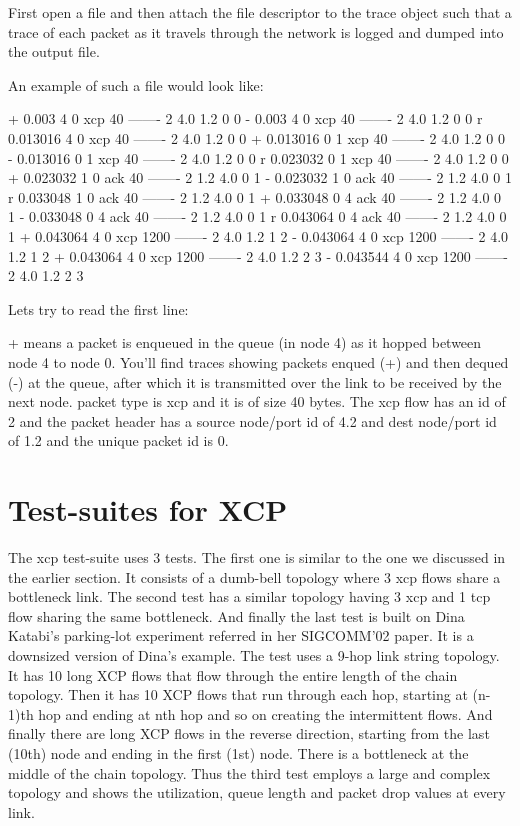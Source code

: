   First open a file and then attach the file descriptor to the \ns{}
  trace object such that a trace of each packet as it travels through
  the network is logged and dumped into the output file.
  
  An example of such a file would look like:
  \begin{program}
    + 0.003 4 0 xcp 40 ------- 2 4.0 1.2 0 0
    - 0.003 4 0 xcp 40 ------- 2 4.0 1.2 0 0
    r 0.013016 4 0 xcp 40 ------- 2 4.0 1.2 0 0
    + 0.013016 0 1 xcp 40 ------- 2 4.0 1.2 0 0
    - 0.013016 0 1 xcp 40 ------- 2 4.0 1.2 0 0
    r 0.023032 0 1 xcp 40 ------- 2 4.0 1.2 0 0
    + 0.023032 1 0 ack 40 ------- 2 1.2 4.0 0 1
    - 0.023032 1 0 ack 40 ------- 2 1.2 4.0 0 1
    r 0.033048 1 0 ack 40 ------- 2 1.2 4.0 0 1
    + 0.033048 0 4 ack 40 ------- 2 1.2 4.0 0 1
    - 0.033048 0 4 ack 40 ------- 2 1.2 4.0 0 1
    r 0.043064 0 4 ack 40 ------- 2 1.2 4.0 0 1
    + 0.043064 4 0 xcp 1200 ------- 2 4.0 1.2 1 2
    - 0.043064 4 0 xcp 1200 ------- 2 4.0 1.2 1 2
    + 0.043064 4 0 xcp 1200 ------- 2 4.0 1.2 2 3
    - 0.043544 4 0 xcp 1200 ------- 2 4.0 1.2 2 3
  \end{program}

  Lets try to read the first line:

  
  + means a packet is enqueued in the queue (in node 4) as it hopped
  between node 4 to node 0. You'll find traces showing packets enqued
  (+) and then dequed (-) at the queue, after which it is transmitted
  over the link to be received by the next node. packet
  type is xcp and it is of size 40 bytes. The xcp flow has an id of 2
  and the packet header has a source node/port id of 4.2 and dest
  node/port id of 1.2 and the unique packet id is 0.
    
  \section{Test-suites for XCP}
  \label{sec:test for xcp}
  
  The xcp test-suite uses 3 tests. The first one is similar to the one
  we discussed in the earlier section. It consists of a dumb-bell
  topology where 3 xcp flows share a bottleneck link. The second test
  has a similar topology having 3 xcp and 1 tcp flow sharing the same
  bottleneck. And finally the last test is built on Dina Katabi's
  parking-lot experiment referred in her SIGCOMM'02 paper. It is a
  downsized version of Dina's example. The test uses a 9-hop
  link string topology. It has 10 long XCP flows that flow through the
  entire length of the chain topology. Then it has 10 XCP flows that run
  through each hop, starting at (n-1)th hop and ending at nth hop and so
  on creating the intermittent flows. And finally there are long XCP
  flows in the reverse direction, 
  starting from the last (10th) node and ending in the first (1st) node.
  There is a bottleneck at the middle of the chain topology. Thus the
  third test employs a large and complex topology and shows the
  utilization, queue length and packet drop values at every link.
  

